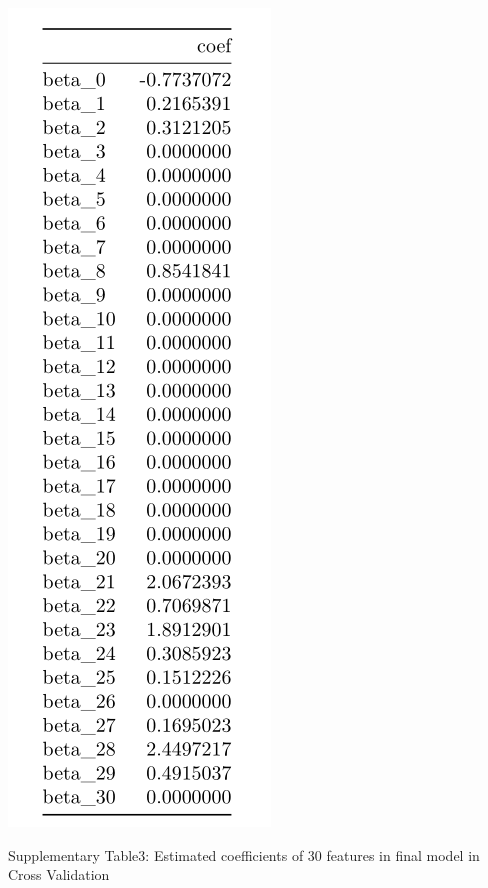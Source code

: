\documentclass[]{article}
\begin{document}
\begin{center}
\includegraphics{./results/30 coefs when lambda=0.03.png}
\end{center}

\begin{center}
Supplementary Table3: Estimated coefficients of 30 features in final model in Cross Validation
\end{center}
\end{document}
